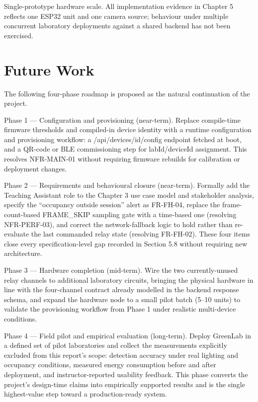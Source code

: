  Single-prototype hardware scale. All implementation evidence in Chapter 5
reflects one ESP32 unit and one camera source; behaviour under multiple
concurrent laboratory deployments against a shared backend has not been
exercised.


\section{Future Work}


The following four-phase roadmap is proposed as the natural continuation of the project.

Phase 1 --- Configuration and provisioning (near-term). Replace compile-time
firmware thresholds and compiled-in device identity with a runtime configuration and
provisioning workflow: a /api/devices/{id}/config endpoint fetched at boot, and a QR-code
or BLE commissioning step for labId/deviceId assignment. This resolves NFR-MAIN-01
without requiring firmware rebuilds for calibration or deployment changes.

Phase 2 --- Requirements and behavioural closure (near-term). Formally add the
Teaching Assistant role to the Chapter 3 use case model and stakeholder analysis, specify
the ``occupancy outside session'' alert as FR-FH-04, replace the frame-count-based
FRAME_SKIP sampling gate with a time-based one (resolving NFR-PERF-03), and correct
the network-fallback logic to hold rather than re-evaluate the last commanded relay state
(resolving FR-FH-02). These four items close every specification-level gap recorded in
Section 5.8 without requiring new architecture.

Phase 3 --- Hardware completion (mid-term). Wire the two currently-unused relay
channels to additional laboratory circuits, bringing the physical hardware in line with
the four-channel contract already modelled in the backend response schema, and
expand the hardware node to a small pilot batch (5--10 units) to validate the provisioning
workflow from Phase 1 under realistic multi-device conditions.

Phase 4 --- Field pilot and empirical evaluation (long-term). Deploy GreenLab in a
defined set of pilot laboratories and collect the measurements explicitly excluded from
this report's scope: detection accuracy under real lighting and occupancy conditions,
measured energy consumption before and after deployment, and instructor-reported
usability feedback. This phase converts the project's design-time claims into empirically
supported results and is the single highest-value step toward a production-ready system.



